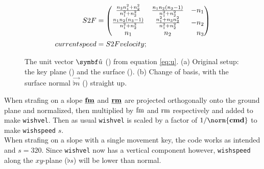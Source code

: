 \begin{align*}
S2F &=
\begin{pmatrix}
\frac{n_3 n_1^2 + n_2^2}{n_1^2 + n_2^2} & \frac{n_1 n_2 (n_3 - 1)}{n_1^2 + n_2^2} & -n_1\\
\frac{n_1 n_2 (n_3 - 1)}{n_1^2 + n_2^2} & \frac{n_1^2 + n_3 n_2^2}{n_1^2 + n_2^2} & -n_2\\
n_1 & n_2 & \hphantom{-}n_3
\end{pmatrix}\\
currentspeed &= S2F velocity;
\end{align*}

\begin{figure}[H]
	\centering
	\begin{subfigure}[t]{\textwidth}
		\centering
		\begin{subfigure}[t]{0.5\textwidth}
			\centering
			\setlength\figureheight{6.5cm}
			\setlength\figurewidth{6.5cm}
		\end{subfigure}%
		\begin{subfigure}[t]{0.5\textwidth}
			\centering
			\setlength\figureheight{5cm}
			\setlength\figurewidth{5cm}
		\end{subfigure}
		\caption{}
	\end{subfigure}
	\begin{subfigure}[t]{\textwidth}
		\centering
		\begin{subfigure}[t]{0.5\textwidth}
			\centering
			\setlength\figureheight{6.5cm}
			\setlength\figurewidth{6.5cm}
		\end{subfigure}%
		\begin{subfigure}[t]{0.5\textwidth}
			\centering
			\setlength\figureheight{5cm}
			\setlength\figurewidth{5cm}
		\end{subfigure}
		\caption{}
	\end{subfigure}
	\caption{The unit vector $\uvec{u}$ (\purplearrow) from equation \eqref{eq:u}. (a) Original setup: the key plane (\orangearea) and the surface (\greenarea). (b) Change of basis, with the surface normal $\vec{\flat{n}}$ (\greenarrow) straight up.}
\end{figure}

When strafing on a slope $\tvec{\flat{\fmove}}$ and $\tvec{\flat{\rmove}}$ are projected orthogonally onto the ground plane and normalized, then multiplied by $\operatorname{fm}$ and $\operatorname{rm}$ respectively and added to make \texttt{wishvel}. Then as usual \texttt{wishvel} is scaled by a factor of $1/\norm{\tvec{\cmd}}$ to make \texttt{wishspeed} $s$.\\
When strafing on a slope with a single movement key, the code works as intended and $s = 320$. Since \texttt{wishvel} now has a vertical component however, \texttt{wishspeed} along the $xy$-plane ($\flat{s}$) will be lower than normal.

